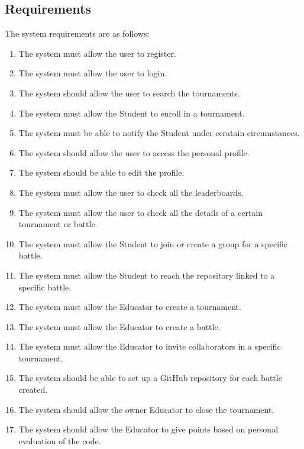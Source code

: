 \documentclass[12pt, a4paper]{report}
\begin{document}
        \subsection{Requirements}
        The system requirements are as follows: 
        \begin{enumerate}
            \item The system must allow the user to register. 
            \item The system must allow the user to login. 
            \item The system should allow the user to search the tournaments. 
            \item The system must allow the Student to enroll in a tournament. 
            \item The system must be able to notify the Student under ceratain circumstances. 
            \item The system should allow the user to access the personal profile. 
            \item The system should be able to edit the profile. 
            \item The system must allow the user to check all the leaderboards. 
            \item The system must allow the user to check all the details of a certain tournament or battle. 
            \item The system must allow the Student to join or create a group for a specific battle. 
            \item The system must allow the Student to reach the repository linked to a specific battle. 
            \item The system must allow the Educator to create a tournament. 
            \item The system must allow the Educator to create a battle. 
            \item The system must allow the Educator to invite collaborators in a specific tournament. 
            \item The system should be able to set up a GitHub repository for each battle created. 
            \item The system should allow the owner Educator to close the tournament. 
            \item The system should allow the Educator to give points based on personal evaluation of the code. 
        \end{enumerate}
\end{document}
